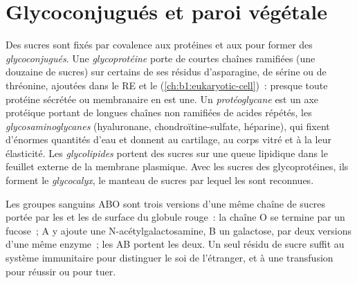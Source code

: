 \section{Glycoconjugués et paroi végétale}

\begin{definition}\label{def:b1:carbohydrates:glycoconjugate}
Des sucres sont fixés par covalence aux protéines et aux  pour
former des \emph{glycoconjugués}. Une
\emph{glycoprotéine} porte de courtes chaînes
ramifiées (une douzaine de sucres) sur certains de ses résidus
d'asparagine, de sérine ou de thréonine, ajoutées dans le RE et le 
(\cref{ch:b1:eukaryotic-cell})~: presque toute protéine sécrétée ou
membranaire en est une. Un \emph{protéoglycane} est
un axe protéique portant de longues chaînes non ramifiées de
 acides répétés, les
\emph{glycosaminoglycanes} (hyaluronane,
chondroïtine-sulfate, héparine), qui fixent d'énormes quantités d'eau et
donnent au cartilage, au corps vitré et à la 
leur élasticité. Les \emph{glycolipides} portent des
sucres sur une queue lipidique dans le feuillet externe de la membrane
plasmique. Avec les sucres des glycoprotéines, ils forment le
\emph{glycocalyx}, le manteau de sucres par lequel les
 sont reconnues.
\end{definition}

\begin{example}\label{ex:b1:carbohydrates:abo}
Les groupes sanguins ABO sont trois versions d'une même chaîne de sucres
portée par les  et les  de surface du globule
rouge~: la chaîne O se termine par un fucose~; A y ajoute une
N-acétylgalactosamine, B un galactose, par deux versions d'une même
enzyme~; les  AB portent les deux. Un seul résidu de sucre
suffit au système immunitaire pour distinguer le soi de l'étranger, et à
une transfusion pour réussir ou pour tuer.
\end{example}

